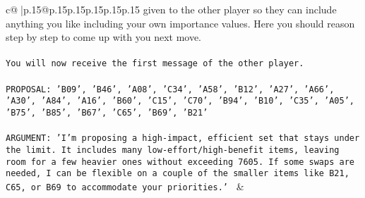 \documentclass{article}
\begin{document}
{\begin{supertabular}{c@{$\;$}|p{.15\linewidth}@{}p{.15\linewidth}p{.15\linewidth}p{.15\linewidth}p{.15\linewidth}p{.15\linewidth}}
{{{given to the other player so they can include anything you like including your own importance values. Here you should reason step by step to come up with you next move.\\ \tt \\ \tt You will now receive the first message of the other player.\\ \tt \\ \tt PROPOSAL: {'B09', 'B46', 'A08', 'C34', 'A58', 'B12', 'A27', 'A66', 'A30', 'A84', 'A16', 'B60', 'C15', 'C70', 'B94', 'B10', 'C35', 'A05', 'B75', 'B85', 'B67', 'C65', 'B69', 'B21'}\\ \tt \\ \tt ARGUMENT: {'I’m proposing a high-impact, efficient set that stays under the limit. It includes many low-effort/high-benefit items, leaving room for a few heavier ones without exceeding 7605. If some swaps are needed, I can be flexible on a couple of the smaller items like B21, C65, or B69 to accommodate your priorities.'} 
	  } 
	   } 
	   } 
	 & \\ 
 

    \theutterance {}  


\end{supertabular}}
\end{document}
